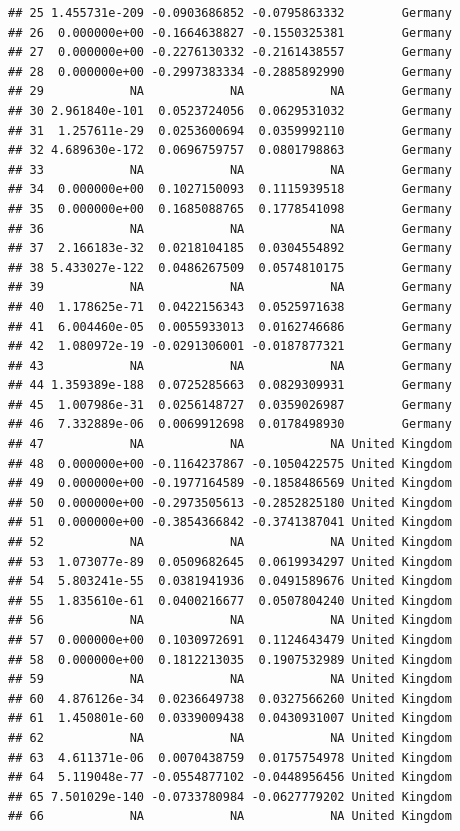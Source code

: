\documentclass[a4paper,12pt]{article}\usepackage[]{graphicx}\usepackage[]{color}
\makeatletter
\newenvironment{kframe}{%
 \def\at@end@of@kframe{}%
 \ifinner\ifhmode%
  \def\at@end@of@kframe{\end{minipage}}%
  \begin{minipage}{\columnwidth}%
 \fi\fi%
 \def\FrameCommand##1{\hskip\@totalleftmargin \hskip-\fboxsep
 \colorbox{shadecolor}{##1}\hskip-\fboxsep
     \hskip-\linewidth \hskip-\@totalleftmargin \hskip\columnwidth}%
 \MakeFramed {\advance\hsize-\width
   \@totalleftmargin\z@ \linewidth\hsize
   \@setminipage}}%
 {\par\unskip\endMakeFramed%
 \at@end@of@kframe}
\newenvironment{knitrout}{}{} %
\makeatother
\begin{document}
\begin{knitrout}
\begin{kframe}
\begin{verbatim}
## 25 1.455731e-209 -0.0903686852 -0.0795863332        Germany
## 26  0.000000e+00 -0.1664638827 -0.1550325381        Germany
## 27  0.000000e+00 -0.2276130332 -0.2161438557        Germany
## 28  0.000000e+00 -0.2997383334 -0.2885892990        Germany
## 29            NA            NA            NA        Germany
## 30 2.961840e-101  0.0523724056  0.0629531032        Germany
## 31  1.257611e-29  0.0253600694  0.0359992110        Germany
## 32 4.689630e-172  0.0696759757  0.0801798863        Germany
## 33            NA            NA            NA        Germany
## 34  0.000000e+00  0.1027150093  0.1115939518        Germany
## 35  0.000000e+00  0.1685088765  0.1778541098        Germany
## 36            NA            NA            NA        Germany
## 37  2.166183e-32  0.0218104185  0.0304554892        Germany
## 38 5.433027e-122  0.0486267509  0.0574810175        Germany
## 39            NA            NA            NA        Germany
## 40  1.178625e-71  0.0422156343  0.0525971638        Germany
## 41  6.004460e-05  0.0055933013  0.0162746686        Germany
## 42  1.080972e-19 -0.0291306001 -0.0187877321        Germany
## 43            NA            NA            NA        Germany
## 44 1.359389e-188  0.0725285663  0.0829309931        Germany
## 45  1.007986e-31  0.0256148727  0.0359026987        Germany
## 46  7.332889e-06  0.0069912698  0.0178498930        Germany
## 47            NA            NA            NA United Kingdom
## 48  0.000000e+00 -0.1164237867 -0.1050422575 United Kingdom
## 49  0.000000e+00 -0.1977164589 -0.1858486569 United Kingdom
## 50  0.000000e+00 -0.2973505613 -0.2852825180 United Kingdom
## 51  0.000000e+00 -0.3854366842 -0.3741387041 United Kingdom
## 52            NA            NA            NA United Kingdom
## 53  1.073077e-89  0.0509682645  0.0619934297 United Kingdom
## 54  5.803241e-55  0.0381941936  0.0491589676 United Kingdom
## 55  1.835610e-61  0.0400216677  0.0507804240 United Kingdom
## 56            NA            NA            NA United Kingdom
## 57  0.000000e+00  0.1030972691  0.1124643479 United Kingdom
## 58  0.000000e+00  0.1812213035  0.1907532989 United Kingdom
## 59            NA            NA            NA United Kingdom
## 60  4.876126e-34  0.0236649738  0.0327566260 United Kingdom
## 61  1.450801e-60  0.0339009438  0.0430931007 United Kingdom
## 62            NA            NA            NA United Kingdom
## 63  4.611371e-06  0.0070438759  0.0175754978 United Kingdom
## 64  5.119048e-77 -0.0554877102 -0.0448956456 United Kingdom
## 65 7.501029e-140 -0.0733780984 -0.0627779202 United Kingdom
## 66            NA            NA            NA United Kingdom

\end{verbatim}
\end{kframe}
\end{knitrout}
\end{document}
